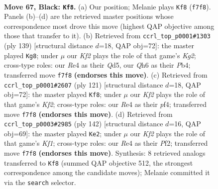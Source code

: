 \documentclass[11pt]{article}
\begin{document}
\clearpage

\begin{figure}[p]\centering
\begin{subfigure}{0.46\textwidth}\centering
\resizebox{\linewidth}{!}{%
\newchessgame
\chessboard[
  setfen={8/3Q1k2/5p1q/3p4/4r3/6P1/6KP/8 b - - 15 67},
  showmover=false,
  pgfstyle=straightmove, color=movearrow, markmove={f7-f8}
]}
\caption{}
\end{subfigure}\hfill
\begin{subfigure}{0.46\textwidth}\centering
\resizebox{\linewidth}{!}{%
\newchessgame
\chessboard[
  setfen={8/4Q1kp/6p1/3q4/1p3P2/6P1/P4K2/8 b - - 8 70},
  showmover=false,
  pgfstyle=straightmove, color=movearrow, markmove={g7-g8}
]}
\caption{}
\end{subfigure}
\\[4pt]
\begin{subfigure}{0.46\textwidth}\centering
\resizebox{\linewidth}{!}{%
\newchessgame
\chessboard[
  setfen={8/3Q1kp1/7p/8/5P2/q6P/6PK/8 b - - 15 61},
  showmover=false,
  pgfstyle=straightmove, color=movearrow, markmove={f7-f8}
]}
\caption{}
\end{subfigure}\hfill
\begin{subfigure}{0.46\textwidth}\centering
\resizebox{\linewidth}{!}{%
\newchessgame
\chessboard[
  setfen={8/8/4Q1p1/6k1/5p2/1P6/5P2/5K1q w - - 14 72},
  showmover=false,
  pgfstyle=straightmove, color=movearrow, markmove={f1-e2}
]}
\caption{}
\end{subfigure}
\caption{\textbf{Move 67, Black: \texttt{Kf8}.} (a) Our position; Melanie plays \texttt{Kf8} (\texttt{f7f8}). Panels (b)--(d) are the retrieved master positions whose correspondence most drove this move (highest QAP objective among those that transfer to it). (b) Retrieved from \texttt{ccrl\_top\_p0001\#1303} (ply 139) [structural distance $d$=18, QAP obj=72]: the master played \texttt{Kg8}; under $\mu$ our \emph{Kf2} plays the role of that game's \emph{Kg2}; cross-type roles: our \emph{R}e4 as their \emph{Q}d5, our \emph{Q}h6 as their \emph{P}b4; transferred move \texttt{f7f8} \textbf{(endorses this move)}. (c) Retrieved from \texttt{ccrl\_top\_p0001\#2607} (ply 121) [structural distance $d$=18, QAP obj=72]: the master played \texttt{Kf8}; under $\mu$ our \emph{Kf2} plays the role of that game's \emph{Kf2}; cross-type roles: our \emph{R}e4 as their \emph{p}f4; transferred move \texttt{f7f8} \textbf{(endorses this move)}. (d) Retrieved from \texttt{ccrl\_top\_p0003\#2985} (ply 142) [structural distance $d$=16, QAP obj=69]: the master played \texttt{Ke2}; under $\mu$ our \emph{Kf2} plays the role of that game's \emph{Kf1}; cross-type roles: our \emph{R}e4 as their \emph{P}f2; transferred move \texttt{f7f8} \textbf{(endorses this move)}. Synthesis: 8 retrieved analogs transferred to \texttt{Kf8} (summed QAP objective 512, the strongest correspondence among the candidate moves); Melanie committed it via the \texttt{search} selector.}
\label{fig:thought-m133}
\end{figure}
\end{document}
